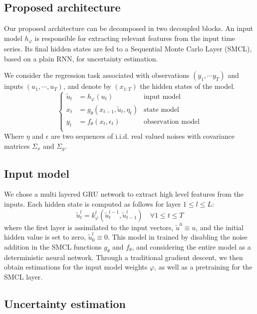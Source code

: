 \documentclass{article}
\begin{document}
\subsection{Proposed architecture}%
\label{sub:proposed_architecture}

Our proposed architecture can be decomposed in two decoupled blocks.
An input model $h_\varphi$ is responsible for extracting relevant features from the input time series.
Its final hidden states are fed to a Sequential Monte Carlo Layer (SMCL), based on a plain RNN, for uncertainty estimation.

We consider the regression task associated with observations $(y_1, \cdots y_T)$ and inputs $(u_1, \cdots, u_T)$, and denote by $(x_{1:T})$ the hidden states of the model.
\begin{equation*}
	\left\{
	\begin{aligned}
		\tilde u_t & = h_\varphi(u_t)                        & \text{input model}       \\
		x_t        & = g_\theta(x_{t-1}, \tilde u_t, \eta_t) & \text{state model}       \\
		y_t        & = f_\theta(x_t, \epsilon_t)             & \text{observation model} \\
	\end{aligned}
	\right.
\end{equation*}
Where $\eta$ and $\epsilon$ are two sequences of i.i.d. real valued noises with covariance matrices $\Sigma_x$ and $\Sigma_y$.

\subsection{Input model}%
\label{sub:input_model}
We chose a multi layered GRU network to extract high level features from the inputs.
Each hidden state is computed as follows for layer $1 \leq l \leq L$:
$$
	\tilde u^l_t = k_\varphi^l(\tilde u^{l-1}_t, \tilde u^l_{t-1}) \quad \forall 1 \leq t \leq T
$$
where the first layer is assimilated to the input vectors, $\tilde u^0 \equiv u$, and the initial hidden value is set to zero, $\tilde u^l_0 \equiv 0$.
This model in trained by disabling the noise addition in the SMCL functions $g_\theta$ and $f_\theta$, and considering the entire model as a deterministic neural network.
Through a traditional gradient descent, we then obtain estimations for the input model weights $\varphi$, as well as a pretraining for the SMCL layer.

\subsection{Uncertainty estimation}%
\label{sub:uncertainty_estimation}
\end{document}
